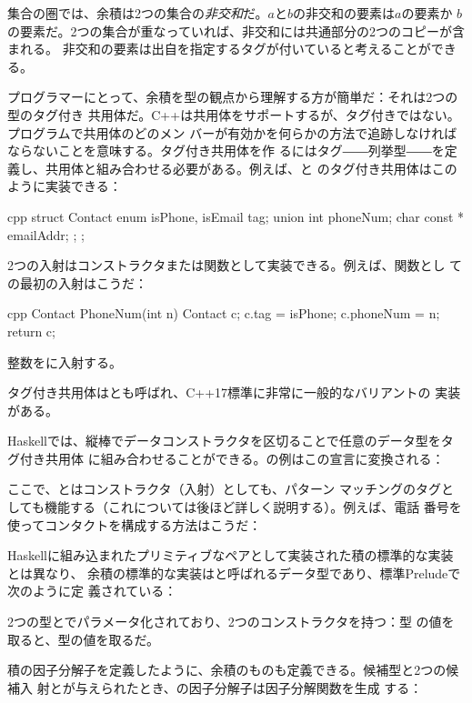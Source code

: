 \noindent
集合の圏では、余積は2つの集合の\emph{非交和}だ。$a$と$b$の非交和の要素は$a$の要素か
$b$の要素だ。2つの集合が重なっていれば、非交和には共通部分の2つのコピーが含まれる。
非交和の要素は出自を指定するタグが付いていると考えることができる。

プログラマーにとって、余積を型の観点から理解する方が簡単だ：それは2つの型のタグ付き
共用体だ。C++は共用体をサポートするが、タグ付きではない。プログラムで共用体のどのメン
バーが有効かを何らかの方法で追跡しなければならないことを意味する。タグ付き共用体を作
るにはタグ――列挙型――を定義し、共用体と組み合わせる必要がある。例えば、と
のタグ付き共用体はこのように実装できる：

\begin{snip}{cpp}
struct Contact {
    enum { isPhone, isEmail } tag;
    union { int phoneNum; char const * emailAddr; };
};
\end{snip}
2つの入射はコンストラクタまたは関数として実装できる。例えば、関数とし
ての最初の入射はこうだ：

\begin{snip}{cpp}
Contact PhoneNum(int n) {
    Contact c;
    c.tag = isPhone;
    c.phoneNum = n;
    return c;
}
\end{snip}
整数をに入射する。

タグ付き共用体はとも呼ばれ、C++17標準に非常に一般的なバリアントの
実装がある。

Haskellでは、縦棒でデータコンストラクタを区切ることで任意のデータ型をタグ付き共用体
に組み合わせることができる。の例はこの宣言に変換される：

ここで、とはコンストラクタ（入射）としても、パターン
マッチングのタグとしても機能する（これについては後ほど詳しく説明する）。例えば、電話
番号を使ってコンタクトを構成する方法はこうだ：

Haskellに組み込まれたプリミティブなペアとして実装された積の標準的な実装とは異なり、
余積の標準的な実装はと呼ばれるデータ型であり、標準Preludeで次のように定
義されている：

2つの型とでパラメータ化されており、2つのコンストラクタを持つ：型
の値を取ると、型の値を取るだ。

積の因子分解子を定義したように、余積のものも定義できる。候補型と2つの候補入
射とが与えられたとき、の因子分解子は因子分解関数を生成
する：

